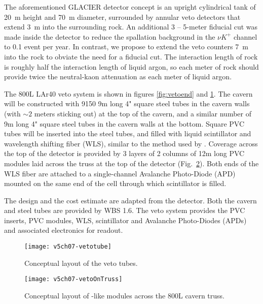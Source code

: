 The aforementioned GLACIER detector concept is an upright cylindrical tank of 20~m height and 70~m diameter, surrounded by annular veto detectors that extend 3~m into the surrounding rock. An additional 3 -- 5-meter fiducial cut was made inside the detector to reduce the spallation background in the  $\nu K^+$ channel to 0.1 event per year. In contrast, we propose to extend the veto counters 7~m into the rock to obviate the need for a fiducial cut. The interaction length of rock is roughly half the interaction length of liquid argon, so each meter of rock should provide twice the neutral-kaon attenuation as each meter of liquid argon. 

The 800L LAr40 veto system is shown in figures \ref{fig:vetoend} and \ref{fig:vetotube}.  The cavern will be 
constructed with 9150 9m long 4" square steel tubes in the cavern walls (with $\sim2$ meters sticking out) at the top of the cavern, and a similar number of 9m long 4" square steel tubes in the cavern walls at the bottom.  Square PVC tubes will be inserted into the steel tubes, and filled with liquid scintillator and wavelength shifting fiber (WLS), similar to the method used by \NOvA.  Coverage across the top of the detector is provided by 3 layers of 2 columns of 12m long \NOvA PVC modules laid across the truss at the top of the detector (Fig.~\ref{fig:vetoOnTruss}).   Both ends of the WLS fiber are attached to a single-channel Avalanche Photo-Diode (APD) mounted on the same end of the cell through which scintillator is filled. 

The design and the cost estimate are adapted from the \NOvA detector.  Both the cavern and steel tubes are provided by WBS 1.6.  The veto system provides the PVC inserts, \NOvA PVC modules, WLS, scintillator and Avalanche Photo-Diodes (APDs) and associated electronics for readout.  

\begin{figure}[h]
\centering
\texttt{[image: v5ch07-vetotube]}
\caption{Conceptual layout of the veto tubes.}
\label{fig:vetotube}
\end{figure}

\begin{figure}[h]
\centering
\texttt{[image: v5ch07-vetoOnTruss]}
\caption{Conceptual layout of \NOvA-like modules across the 800L cavern truss.}
\label{fig:vetoOnTruss}
\end{figure}

